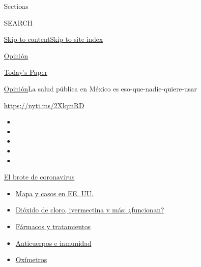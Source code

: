 Sections

SEARCH

\protect\hyperlink{site-content}{Skip to
content}\protect\hyperlink{site-index}{Skip to site index}

\href{https://www.nytimes.com/es/section/opinion}{Opinión}

\href{https://myaccount.nytimes.com/auth/login?response_type=cookie\&client_id=vi}{}

\href{https://www.nytimes.com/section/todayspaper}{Today's Paper}

\href{/es/section/opinion}{Opinión}\textbar{}La salud pública en México
es eso-que-nadie-quiere-usar

\url{https://nyti.ms/2XlqmRD}

\begin{itemize}
\item
\item
\item
\item
\item
\end{itemize}

\href{https://www.nytimes.com/es/spotlight/coronavirus?action=click\&pgtype=Article\&state=default\&region=TOP_BANNER\&context=storylines_menu}{El
brote de coronavirus}

\begin{itemize}
\tightlist
\item
  \href{https://www.nytimes.com/es/interactive/2020/espanol/mundo/coronavirus-en-estados-unidos.html?action=click\&pgtype=Article\&state=default\&region=TOP_BANNER\&context=storylines_menu}{Mapa
  y casos en EE. UU.}
\item
  \href{https://www.nytimes.com/es/2020/07/23/espanol/america-latina/bolivia-cloro-coronavirus-ivermectina.html?action=click\&pgtype=Article\&state=default\&region=TOP_BANNER\&context=storylines_menu}{Dióxido
  de cloro, ivermectina y más: ¿funcionan?}
\item
  \href{https://www.nytimes.com/es/interactive/2020/science/coronavirus-tratamientos-curas.html?action=click\&pgtype=Article\&state=default\&region=TOP_BANNER\&context=storylines_menu}{Fármacos
  y tratamientos}
\item
  \href{https://www.nytimes.com/es/2020/07/28/espanol/ciencia-y-tecnologia/anticuerpos-coronavirus-inmunidad.html?action=click\&pgtype=Article\&state=default\&region=TOP_BANNER\&context=storylines_menu}{Anticuerpos
  e inmunidad}
\item
  \href{https://www.nytimes.com/es/2020/04/29/espanol/estilos-de-vida/oximetro-para-que-sirve.html?action=click\&pgtype=Article\&state=default\&region=TOP_BANNER\&context=storylines_menu}{Oxímetros}
\end{itemize}

